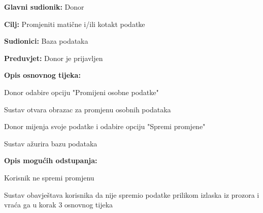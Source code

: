 					\begin{packed_item}
	
						\item \textbf{Glavni sudionik: }Donor
						\item \textbf{Cilj:} Promjeniti matične i/ili kotakt podatke
						\item \textbf{Sudionici:} Baza podataka
						\item \textbf{Preduvjet:} Donor je prijavljen
						\item \textbf{Opis osnovnog tijeka:}
						
						\item[] \begin{packed_enum}
	
							\item Donor odabire opciju "Promijeni osobne podatke"
							\item Sustav otvara obrazac za promjenu osobnih podataka
							\item Donor mijenja svoje podatke i odabire opciju "Spremi promjene"
							
							\item Sustav ažurira bazu podataka
							
						\end{packed_enum}

						\item  \textbf{Opis mogućih odstupanja:}
						
						\item[] \begin{packed_item}
	
							\item[3.a] Korisnik ne spremi promjenu
							\item[] \begin{packed_enum}
								
								\item  Sustav obavještava korisnika da nije spremio podatke prilikom izlaska iz prozora i vraća ga u korak 3 osnovnog tijeka
							 

								
									\end{packed_enum}
								\end{packed_item}
					\end{packed_item}
\noindent {}
